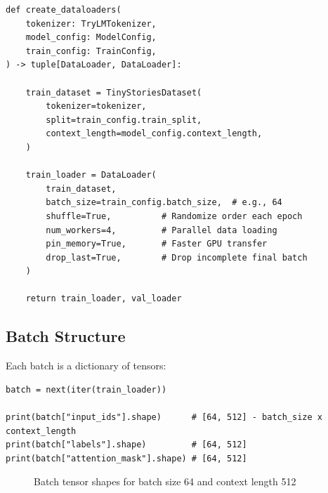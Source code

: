 \begin{lstlisting}[style=python, caption={DataLoader creation from data.py}]
def create_dataloaders(
    tokenizer: TryLMTokenizer,
    model_config: ModelConfig,
    train_config: TrainConfig,
) -> tuple[DataLoader, DataLoader]:

    train_dataset = TinyStoriesDataset(
        tokenizer=tokenizer,
        split=train_config.train_split,
        context_length=model_config.context_length,
    )

    train_loader = DataLoader(
        train_dataset,
        batch_size=train_config.batch_size,  # e.g., 64
        shuffle=True,          # Randomize order each epoch
        num_workers=4,         # Parallel data loading
        pin_memory=True,       # Faster GPU transfer
        drop_last=True,        # Drop incomplete final batch
    )

    return train_loader, val_loader
\end{lstlisting}

\subsection{Batch Structure}

Each batch is a dictionary of tensors:

\begin{lstlisting}[style=python]
batch = next(iter(train_loader))

print(batch["input_ids"].shape)      # [64, 512] - batch_size x context_length
print(batch["labels"].shape)         # [64, 512]
print(batch["attention_mask"].shape) # [64, 512]
\end{lstlisting}

\begin{figure}[H]
\centering
{}
\caption{Batch tensor shapes for batch size 64 and context length 512}
\label{fig:batch-shapes}
\end{figure}

